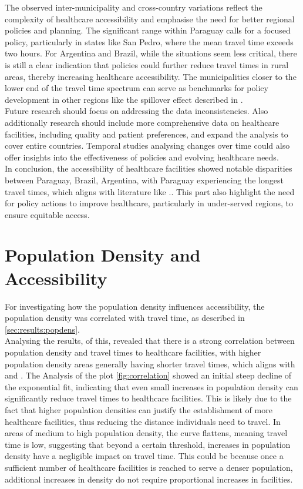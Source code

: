 \documentclass[11pt, a4paper]{report}
\begin{document}
The observed inter-municipality and cross-country variations reflect the complexity of healthcare accessibility and emphasise the need for better regional policies and planning. The significant range within Paraguay calls for a focused policy, particularly in states like San Pedro, where the mean travel time exceeds two hours. For Argentina and Brazil, while the situations seem less critical, there is still a clear indication that policies could further reduce travel times in rural areas, thereby increasing healthcare accessibility. The municipalities closer to the lower end of the travel time spectrum can serve as benchmarks for policy development in other regions like the spillover effect described in \citet{piquer-rodriguez_land_2021}. \\
%
Future research should focus on addressing the data inconsistencies. Also additionally research should include more comprehensive data on healthcare facilities, including quality and patient preferences, and expand the analysis to cover entire countries. Temporal studies analysing changes over time could also offer insights into the effectiveness of policies and evolving healthcare needs. \\
%
In conclusion, the accessibility of healthcare facilities showed notable disparities between Paraguay, Brazil, Argentina, with Paraguay experiencing the longest travel times, which aligns with literature like \cite{gbd_2016_healthcare_access_and_quality_collaborators_measuring_2018}.. This part also highlight the need for policy actions to improve healthcare, particularly in under-served regions, to ensure equitable access.



\section{Population Density and Accessibility}

For investigating how the population density influences accessibility, the population density was correlated with travel time, as described in \ref{sec:results:popdens}. \\
%
Analysing the results, of this, revealed that there is a strong correlation between population density and travel times to healthcare facilities, with higher population density areas generally having shorter travel times, which aligns with \cite{obubu_evaluation_2023} and \cite{shi_revealing_2020}. The Analysis of the plot \ref{fig:correlation} showed an initial steep decline of the exponential fit, indicating that even small increases in population density can significantly reduce travel times to healthcare facilities. This is likely due to the fact that higher population densities can justify the establishment of more healthcare facilities, thus reducing the distance individuals need to travel.
In areas of medium to high population density, the curve flattens, meaning travel time is low, suggesting that beyond a certain threshold, increases in population density have a negligible impact on travel time. This could be because once a sufficient number of healthcare facilities is reached to serve a denser population, additional increases in density do not require proportional increases in facilities.
\end{document}
